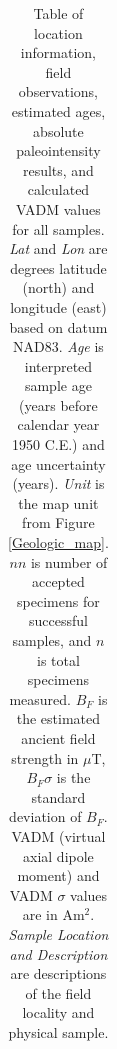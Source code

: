 \documentclass[draft]{agujournal2019}
\begin{document}
\begin{landscape}
\footnotesize
{}\textwidth
\begin{longtable}{lcccccccccl}
\caption{Table of location information, field observations, estimated ages, absolute paleointensity results, and calculated VADM values for all samples. \textit{Lat} and \textit{Lon} are degrees latitude (north) and longitude (east) based on datum NAD83. \textit{Age} is interpreted sample age (years before calendar year 1950 C.E.) and age uncertainty (years). \textit{Unit} is the map unit from Figure \ref{Geologic_map}. $nn$ is number of accepted specimens for successful samples, and $n$ is total specimens measured. $B_{F}$ is the estimated ancient field strength in $\mu$T, $B_{F} \sigma$ is the standard deviation of $B_{F}$. VADM (virtual axial dipole moment) and VADM $\sigma$ values are in Am$^{2}$. \textit{Sample Location and Description} are descriptions of the field locality and physical sample.}\\


\end{longtable}
\end{landscape}
\end{document}
